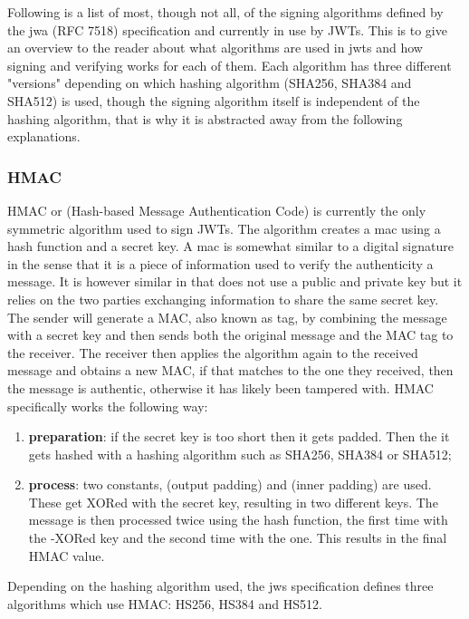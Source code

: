 Following is a list of most, though not all, of the signing algorithms defined by the \gls{jwa} (RFC 7518) \cite{rfc7518-jwa} specification and currently in use by JWTs. This is to give an overview to the reader about what algorithms are used in \gls{jwt}s and how signing and verifying works for each of them. Each algorithm has three different "versions" depending on which hashing algorithm (SHA256, SHA384 and SHA512) is used, though the signing algorithm itself is independent of the hashing algorithm, that is why it is abstracted away from the following explanations.

\subsubsection{HMAC}
HMAC or (Hash-based Message Authentication Code) is currently the only symmetric algorithm used to sign JWTs. The algorithm creates a \gls{mac} using a hash function and a secret key. A \gls{mac} is somewhat similar to a digital signature in the sense that it is a piece of information used to verify the authenticity a message. It is however similar in that does not use a public and private key but it relies on the two parties exchanging information to share the same secret key. The sender will generate a MAC, also known as tag, by combining the message with a secret key and then sends both the original message and the MAC tag to the receiver. The receiver then applies the algorithm again to the received message and obtains a new MAC, if that matches to the one they received, then the message is authentic, otherwise it has likely been tampered with.
HMAC specifically works the following way:
\begin{enumerate}
    \item \textbf{preparation}: if the secret key is too short then it gets padded. Then the it gets hashed with a hashing algorithm such as SHA256, SHA384 or SHA512;
    \item \textbf{process}: two constants,  (output padding) and  (inner padding) are used. These get XORed with the secret key, resulting in two different keys. The message is then processed twice using the hash function, the first time with the -XORed key and the second time with the  one.
    This results in the final HMAC value.
\end{enumerate}
\cite{rfc2104-hmac}
Depending on the hashing algorithm used, the \gls{jws} specification defines three algorithms which use HMAC: HS256, HS384 and HS512. \cite{rfc7515-jws}

